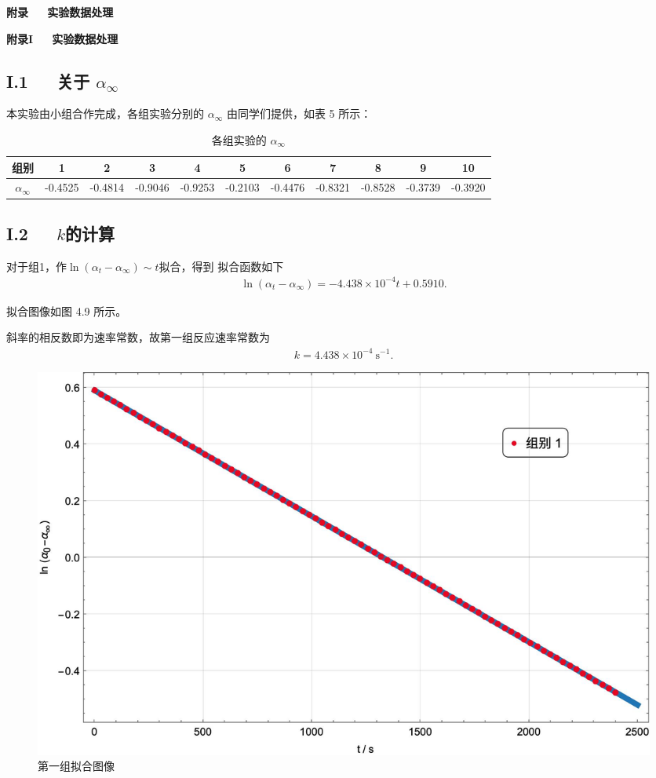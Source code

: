 \documentclass[12pt]{ctexart}
\numberwithin{equation}{section}
\begin{document}
\begin{center}
    \LARGE\bfseries{附录~~~实验数据处理}
\end{center}
\begin{center}
    \Large\bfseries{附录I~~~实验数据处理}
\end{center}

\subsection*{I.1~~~关于 $\alpha_{\infty}$}

本实验由小组合作完成，各组实验分别的 $\alpha_{\infty}$ 由同学们提供，如表 5 所示：

\begin{longtable}{c|cccccccccc}
    \caption{各组实验的 $\alpha_{\infty}$ }\\
    \hline
    组别 & 1 & 2 & 3 & 4 & 5 & 6 & 7 & 8 & 9 & 10\\
    \hline
    $\alpha_{\infty}$ & -0.4525 & -0.4814 & -0.9046 & -0.9253 & -0.2103 & -0.4476 & -0.8321 & -0.8528& -0.3739& -0.3920 \\
    \hline
\end{longtable}

\subsection*{I.2~~~$k$的计算}

对于组1，作$\ln(\alpha_t - \alpha_\infty) \sim t$拟合，得到
拟合函数如下
\begin{align}
    \ln(\alpha_t - \alpha_\infty) = -4.438\times 10^{-4} t + 0.5910.
    \tag{I.1}
\end{align}

拟合图像如图 4.9 所示。

斜率的相反数即为速率常数，故第一组反应速率常数为
\begin{align}
    k = 4.438\times 10^{-4}~\mathrm{s^{-1}}.
    \tag{I.2}
\end{align}

\begin{figure}[!h]
    \centering
    \includegraphics[scale=0.4]{first.jpg}
    \caption{第一组拟合图像}
\end{figure}
\end{document}
